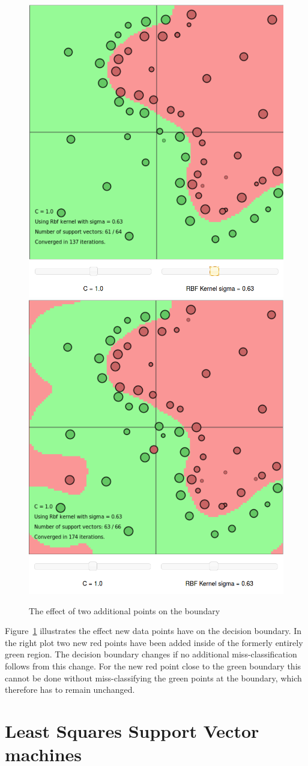 \begin{figure}
\centering
\includegraphics[width=0.33\linewidth]{../src/figure/largeRBF}
\includegraphics[width=0.33\linewidth]{../src/figure/twoNewPoints}
\caption{The effect of two additional points on the boundary}
\label{fig:twoNewPoints}
\end{figure}
Figure~\ref{fig:twoNewPoints} illustrates the effect new data points have on the decision boundary. In the right plot two new red points have been added inside of the formerly entirely green region. The decision boundary changes if no additional miss-classification follows from this change. For the new red point close to the green boundary this cannot be done without miss-classifying the green points at the boundary, which therefore has to remain unchanged. 

\section{Least Squares Support Vector machines}